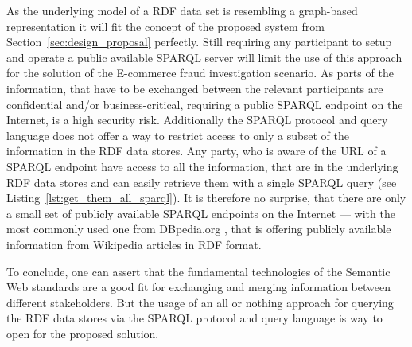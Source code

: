 As the underlying model of a \gls{RDF} data set is resembling a graph-based representation it will fit the concept of the proposed system from Section~\ref{sec:design_proposal} perfectly. Still requiring any participant to setup and operate a public available \gls{SPARQL} server will limit the use of this approach for the solution of the \gls{E-commerce} fraud investigation scenario. As parts of the information, that have to be exchanged between the relevant participants are confidential and/or business-critical, requiring a public \gls{SPARQL} endpoint on the Internet, is a high security risk. Additionally the \gls{SPARQL} protocol and query language does not offer a way to restrict access to only a subset of the information in the \gls{RDF} data stores. Any party, who is aware of the \gls{URL} of a \gls{SPARQL} endpoint have access to all the information, that are in the underlying \gls{RDF} data stores and can easily retrieve them with a single \gls{SPARQL} query (see Listing~\ref{lst:get_them_all_sparql}). It is therefore no surprise, that there are only a small set of publicly available \gls{SPARQL} endpoints on the Internet --- with the most commonly used one from DBpedia.org \citep{dbPedia.org}, that is offering publicly available information from Wikipedia articles in \gls{RDF} format. \@


To conclude, one can assert that the fundamental technologies of the Semantic Web standards are a good fit for exchanging and merging information between different stakeholders. But the usage of an all or nothing approach for querying the \gls{RDF} data stores via the \gls{SPARQL} protocol and query language is way to open for the proposed solution.


